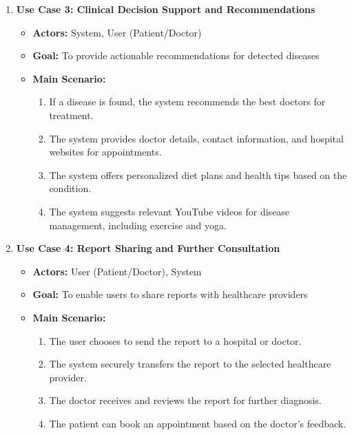 \documentclass[12pt]{article}
\numberwithin{figure}{subsection}
\begin{document}
\begin{enumerate}
    \item \textbf{Use Case 3: Clinical Decision Support and Recommendations}  
    \begin{itemize}
        \item \textbf{Actors:} System, User (Patient/Doctor)  
        \item \textbf{Goal:} To provide actionable recommendations for detected diseases  
        \item \textbf{Main Scenario:}
        \begin{enumerate}
            \item If a disease is found, the system recommends the best doctors for treatment.  
            \item The system provides doctor details, contact information, and hospital websites for appointments.  
            \item The system offers personalized diet plans and health tips based on the condition.  
            \item The system suggests relevant YouTube videos for disease management, including exercise and yoga.  
        \end{enumerate}
    \end{itemize}

    \item \textbf{Use Case 4: Report Sharing and Further Consultation}  
    \begin{itemize}
        \item \textbf{Actors:} User (Patient/Doctor), System  
        \item \textbf{Goal:} To enable users to share reports with healthcare providers  
        \item \textbf{Main Scenario:}
        \begin{enumerate}
            \item The user chooses to send the report to a hospital or doctor.  
            \item The system securely transfers the report to the selected healthcare provider.  
            \item The doctor receives and reviews the report for further diagnosis.  
            \item The patient can book an appointment based on the doctor's feedback.  
        \end{enumerate}
    \end{itemize}


\end{enumerate}
\end{document}
